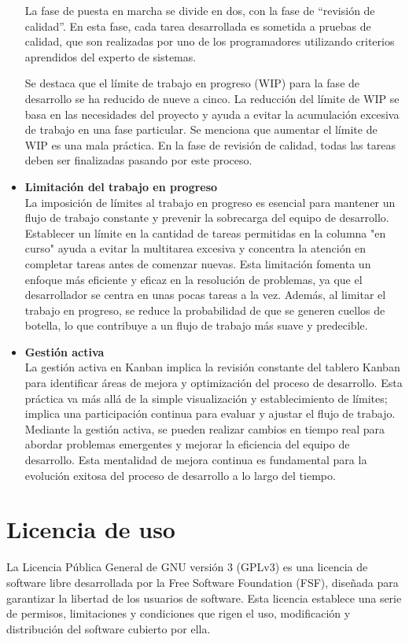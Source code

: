\begin{itemize}
  La fase de puesta en marcha se divide en dos, con la fase de ``revisión de calidad''. En esta fase, cada tarea desarrollada es sometida a pruebas de calidad, que son realizadas por uno de los programadores utilizando criterios aprendidos del experto de sistemas.
  
  Se destaca que el límite de trabajo en progreso (WIP) para la fase de desarrollo se ha reducido de nueve a cinco. La reducción del límite de WIP se basa en las necesidades del proyecto y ayuda a evitar la acumulación excesiva de trabajo en una fase particular. Se menciona que aumentar el límite de WIP es una mala práctica. En la fase de revisión de calidad, todas las tareas deben ser finalizadas pasando por este proceso. \parencite{Bermejo2010}

  \item \textbf{Limitación del trabajo en progreso} \\
  La imposición de límites al trabajo en progreso es esencial para mantener un flujo de trabajo constante y prevenir la sobrecarga del equipo de desarrollo. Establecer un límite en la cantidad de tareas permitidas en la columna "en curso" ayuda a evitar la multitarea excesiva y concentra la atención en completar tareas antes de comenzar nuevas. Esta limitación fomenta un enfoque más eficiente y eficaz en la resolución de problemas, ya que el desarrollador se centra en unas pocas tareas a la vez. Además, al limitar el trabajo en progreso, se reduce la probabilidad de que se generen cuellos de botella, lo que contribuye a un flujo de trabajo más suave y predecible. \parencite{Anderson2010}

  \item \textbf{Gestión activa} \\
  La gestión activa en Kanban implica la revisión constante del tablero Kanban para identificar áreas de mejora y optimización del proceso de desarrollo. Esta práctica va más allá de la simple visualización y establecimiento de límites; implica una participación continua para evaluar y ajustar el flujo de trabajo. Mediante la gestión activa, se pueden realizar cambios en tiempo real para abordar problemas emergentes y mejorar la eficiencia del equipo de desarrollo. Esta mentalidad de mejora continua es fundamental para la evolución exitosa del proceso de desarrollo a lo largo del tiempo. \parencite{Anderson2010}
\end{itemize}

\section{Licencia de uso}
La Licencia Pública General de GNU versión 3 (GPLv3) es una licencia de software libre desarrollada por la Free Software Foundation (FSF), diseñada para garantizar la libertad de los usuarios de software. Esta licencia establece una serie de permisos, limitaciones y condiciones que rigen el uso, modificación y distribución del software cubierto por ella. \parencite{GNU2021}

